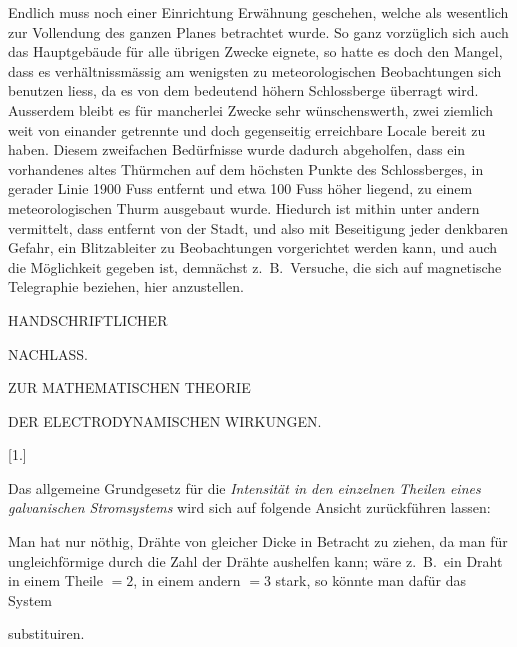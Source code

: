 Endlich muss noch einer Einrichtung Erwähnung geschehen, welche als wesentlich zur Vollendung des ganzen Planes betrachtet wurde. So ganz vorzüglich sich auch das Hauptgebäude für alle übrigen Zwecke eignete, so hatte es doch den Mangel, dass es verhältnissmässig am wenigsten zu meteorologischen Beobachtungen sich benutzen liess, da es von dem bedeutend höhern Schlossberge überragt wird. Ausserdem bleibt es für mancherlei Zwecke sehr wünschenswerth, zwei ziemlich weit von einander getrennte und doch gegenseitig erreichbare Locale bereit zu haben. Diesem zweifachen Bedürfnisse wurde dadurch abgeholfen, dass ein vorhandenes altes Thürmchen auf dem höchsten Punkte des Schlossberges, in gerader Linie 1900 Fuss entfernt und etwa 100 Fuss höher liegend, zu einem meteorologischen Thurm ausgebaut wurde. Hiedurch ist mithin unter andern vermittelt, dass entfernt von der Stadt, und also mit Beseitigung jeder denkbaren Gefahr, ein Blitzableiter zu Beobachtungen vorgerichtet werden kann, und auch die Möglichkeit gegeben ist, demnächst z.\ B.\ Versuche, die sich auf magnetische Telegraphie beziehen, hier anzustellen.

\clearpage
{}
\thispagestyle{empty}
\vspace*{35mm}
\begin{center}
{\large HANDSCHRIFTLICHER}\par\vspace{20mm}
{\LARGE NACHLASS.}
\end{center}
\clearpage
{}
\begin{center}
{\large ZUR MATHEMATISCHEN THEORIE}\par\vspace{3mm}
{\large DER ELECTRODYNAMISCHEN WIRKUNGEN.}
\end{center}
\begin{center}[1.]\end{center}
Das allgemeine Grundgesetz für die \textit{Intensität in den einzelnen Theilen eines galvanischen Stromsystems} wird sich auf folgende Ansicht zurückführen lassen:

Man hat nur nöthig, Drähte von gleicher Dicke in Betracht zu ziehen, da man für ungleichförmige durch die Zahl der Drähte aushelfen kann; wäre z.\ B.\ ein Draht in einem Theile $=2$, in einem andern $=3$ stark, so könnte man dafür das System
\begin{center}\resizebox{.62\linewidth}{!}{}\end{center}
substituiren.

